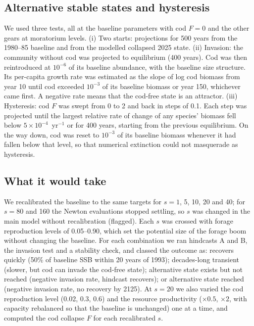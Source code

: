 \documentclass[12pt,letterpaper,fleqn]{article}
\newcommand{\yr}{yr$^{-1}$}
\begin{document}
\subsection{Alternative stable states and hysteresis}\label{sec:altstates}

We used three tests, all at the baseline parameters with cod $F=0$ and the other gears at moratorium levels. (i) Two starts: projections for 500 years from the 1980--85 baseline and from the modelled collapsed 2025 state. (ii) Invasion: the community without cod was projected to equilibrium (400 years). Cod was then reintroduced at $10^{-6}$ of its baseline abundance, with the baseline size structure. Its per-capita growth rate was estimated as the slope of log cod biomass from year 10 until cod exceeded $10^{-3}$ of its baseline biomass or year 150, whichever came first. A negative rate means that the cod-free state is an attractor. (iii) Hysteresis: cod $F$ was swept from 0 to 2 and back in steps of 0.1. Each step was projected until the largest relative rate of change of any species' biomass fell below $5\times10^{-4}$~\yr{} or for 400 years, starting from the previous equilibrium. On the way down, cod was reset to $10^{-3}$ of its baseline biomass whenever it had fallen below that level, so that numerical extinction could not masquerade as hysteresis.

\subsection{What it would take}\label{sec:wouldtake}

We recalibrated the baseline to the same targets for $s=1$, 5, 10, 20 and 40; for $s=80$ and 160 the Newton evaluations stopped settling, so $s$ was changed in the main model without recalibration (flagged). Each $s$ was crossed with forage reproduction levels of 0.05--0.90, which set the potential size of the forage boom without changing the baseline. For each combination we ran hindcasts A and B, the invasion test and a stability check, and classed the outcome as: recovers quickly (50\% of baseline SSB within 20 years of 1993); decades-long transient (slower, but cod can invade the cod-free state); alternative state exists but not reached (negative invasion rate, hindcast recovers); or alternative state reached (negative invasion rate, no recovery by 2125). At $s=20$ we also varied the cod reproduction level (0.02, 0.3, 0.6) and the resource productivity ($\times0.5$, $\times2$, with capacity rebalanced so that the baseline is unchanged) one at a time, and computed the cod collapse $F$ for each recalibrated $s$.
\end{document}

